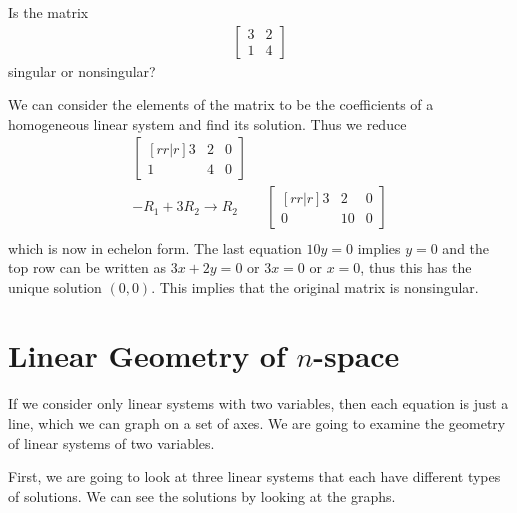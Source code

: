 \begin{example}
Is the matrix 
%
\begin{align*} \begin{bmatrix}
3 & 2 \\
1 & 4
\end{bmatrix}
\end{align*}
singular or nonsingular? 

\solution

We can consider the elements of the matrix to be the coefficients of a homogeneous linear system and find its solution.  Thus we reduce 
%
\begin{align*}
\begin{bmatrix}[rr|r]
3 & 2 & 0 \\
1 & 4 & 0 
\end{bmatrix} \\
-R_1 + 3R_2 \rightarrow R_2 \qquad
\begin{bmatrix}[rr|r]
3 & 2 & 0 \\
0 & 10 & 0 
\end{bmatrix} \\
\end{align*}
which is now in echelon form.  The last equation $10y=0$ implies $y=0$ and the top row can be written as $3x+2y=0$ or $3x=0$ or $x=0$, thus this has the unique solution $(0,0)$.  This implies that the original matrix is nonsingular.  
\end{example}


\vfill \pagebreak
\section{Linear Geometry of \texorpdfstring{$n$}{n}-space} \label{sect:linear:geom}



If we consider only linear systems with two variables, then each equation is just a line, which we can graph on a set of axes. We are going to examine the geometry of linear systems of two variables.  

First, we are going to look at three linear systems that each have different types of solutions.  We can see the solutions by looking at the graphs. 

